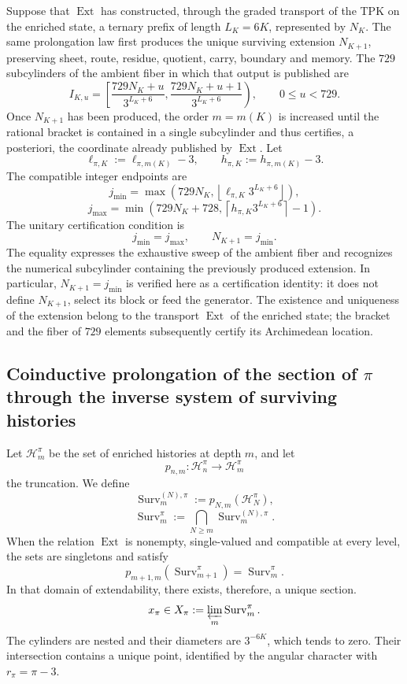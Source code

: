 Suppose that \(\operatorname{Ext}\) has constructed, through the graded transport
of the TPK on the enriched state, a ternary prefix of length
\(L_K=6K\), represented by \(N_K\). The same prolongation law first produces
the unique surviving extension \(N_{K+1}\), preserving sheet,
route, residue, quotient, carry, boundary and memory. The \(729\)
subcylinders of the ambient fiber in which that output is published are
\[
 I_{K,u}=
 \left[
 \frac{729N_K+u}{3^{L_K+6}},
 \frac{729N_K+u+1}{3^{L_K+6}}
 \right),
 \qquad0\leq u<729.
\]
Once \(N_{K+1}\) has been produced, the order \(m=m(K)\) is increased until the
rational bracket is contained in a single subcylinder and thus certifies,
a posteriori, the coordinate already published by \(\operatorname{Ext}\). Let
\[
 \ell_{\pi,K}:=\ell_{\pi,m(K)}-3,
 \qquad
 h_{\pi,K}:=h_{\pi,m(K)}-3.
\]
The compatible integer endpoints are
\[
 j_{\min}=
 \max\!\left(
 729N_K,\left\lfloor
 \ell_{\pi,K}3^{L_K+6}\right\rfloor
 \right),
\]
\[
 j_{\max}=
 \min\!\left(
 729N_K+728,\left\lceil
 h_{\pi,K}3^{L_K+6}\right\rceil-1
 \right).
\]
The unitary certification condition is
\begin{equation}
 \boxed{j_{\min}=j_{\max},\qquad N_{K+1}=j_{\min}.}
 \label{p12-83-c8-s1:eq:seleccion-unitaria-subcilindro-pi}
\end{equation}
The equality expresses the exhaustive sweep of the ambient fiber and recognizes the
numerical subcylinder containing the previously produced extension. In
particular, \(N_{K+1}=j_{\min}\) is verified here as a certification
identity: it does not define \(N_{K+1}\), select its block or feed the
generator. The existence and uniqueness of the extension belong to the
transport \(\operatorname{Ext}\) of the enriched state; the bracket and the
fiber of \(729\) elements subsequently certify its Archimedean
location.

\subsection{Coinductive prolongation of the section of \(\pi\) through the inverse system of surviving histories}

Let \(\mathcal H_m^\pi\) be the set of enriched histories at depth
\(m\), and let
\[
 p_{n,m}:\mathcal H_n^\pi\longrightarrow\mathcal H_m^\pi
\]
the truncation. We define
\[
 \operatorname{Surv}_m^{(N),\pi}
 :=p_{N,m}(\mathcal H_N^\pi),
\]
\[
 \operatorname{Surv}_m^\pi
 :=\bigcap_{N\geq m}\operatorname{Surv}_m^{(N),\pi}.
\]
When the relation \(\operatorname{Ext}\) is nonempty, single-valued and
compatible at every level, the sets are singletons and satisfy
\[
 p_{m+1,m}(\operatorname{Surv}_{m+1}^{\pi})
 =\operatorname{Surv}_{m}^{\pi}.
\]
In that domain of extendability, there exists, therefore, a unique section.
\[
 x_\pi\in
 X_\pi:=\varprojlim_m\operatorname{Surv}_m^\pi.
\]
The cylinders are nested and their diameters are \(3^{-6K}\), which tends to
zero. Their intersection contains a unique point, identified by the angular
character with \(r_\pi=\pi-3\).

